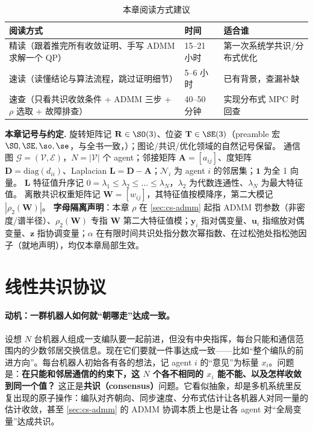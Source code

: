 \begin{table}[H]\centering\small
\caption{本章阅读方式建议}
\label{tab:cs-reading}
\begin{tabular}{lll}
\toprule
阅读方式 & 时间 & 适合谁 \\
\midrule
精读（跟着推完所有收敛证明、手写 ADMM 求解一个 QP） & 15--21 小时 & 第一次系统学共识/分布式优化 \\
速读（读懂结论与算法流程，跳过证明细节） & 5--6 小时 & 已有背景，查漏补缺 \\
速查（只看共识收敛条件 + ADMM 三步 + $\rho$ 选取 + 故障排查） & 40--50 分钟 & 实现分布式 MPC 时回查 \\
\bottomrule
\end{tabular}
\end{table}

\begin{note}
\textbf{本章记号与约定.}\;
旋转矩阵记 $\mathbf{R}\in\SO(3)$、位姿 $\mathbf{T}\in\SE(3)$（preamble 宏 $\SO,\SE,\so,\se$，与全书一致，）；图论/共识/优化领域的自然记号保留。
通信图 $\mathcal{G}=(\mathcal{V},\mathcal{E})$，$N=|\mathcal{V}|$ 个 agent；邻接矩阵 $\mathbf{A}=[a_{ij}]$、度矩阵 $\mathbf{D}=\mathrm{diag}(d_{ii})$、Laplacian $\mathbf{L}=\mathbf{D}-\mathbf{A}$；$\mathcal{N}_i$ 为 agent $i$ 的邻居集；$\mathbf{1}$ 为全 1 向量。
$\mathbf{L}$ 特征值升序记 $0=\lambda_1\le\lambda_2\le\dots\le\lambda_N$，$\lambda_2$ 为代数连通性、$\lambda_N$ 为最大特征值。
离散共识权重矩阵记 $\mathbf{W}=[w_{ij}]$，其特征值按模降序，第二大模记 $|\rho_2(\mathbf{W})|$。
\textbf{字母隔离声明}：本章 $\rho$ 在 \cref{sec:cs-admm} 起指 ADMM 罚参数（非密度/谱半径）、$\rho_2(\mathbf{W})$ 专指 $\mathbf{W}$ 第二大特征值模；$\mathbf{y}_i$ 指对偶变量、$\mathbf{u}_i$ 指缩放对偶变量、$\mathbf{z}$ 指协调变量；$\alpha$ 在有限时间共识处指分数次幂指数、在过松弛处指松弛因子（就地声明），均仅本章局部生效。
\end{note}

\section{线性共识协议}
\label{sec:cs-linear}

\paragraph{动机：一群机器人如何就“朝哪走”达成一致。}
设想 $N$ 台机器人组成一支编队要一起前进，但没有中央指挥，每台只能和通信范围内的少数邻居交换信息。现在它们要就一件事达成一致——比如“整个编队的前进方向”。每台机器人初始各有各的想法，记 agent $i$ 的“意见”为标量 $x_i$。问题是：\textbf{在只能和邻居通信的约束下，这 $N$ 个各不相同的 $x_i$ 能不能、以及怎样收敛到同一个值？} 这正是\textbf{共识（consensus）}问题。它看似抽象，却是多机系统里反复出现的原子操作：编队对齐朝向、同步速度、分布式估计让各机器人对同一量的估计收敛，甚至 \cref{sec:cs-admm} 的 ADMM 协调本质上也是让各 agent 对“全局变量”达成共识。

